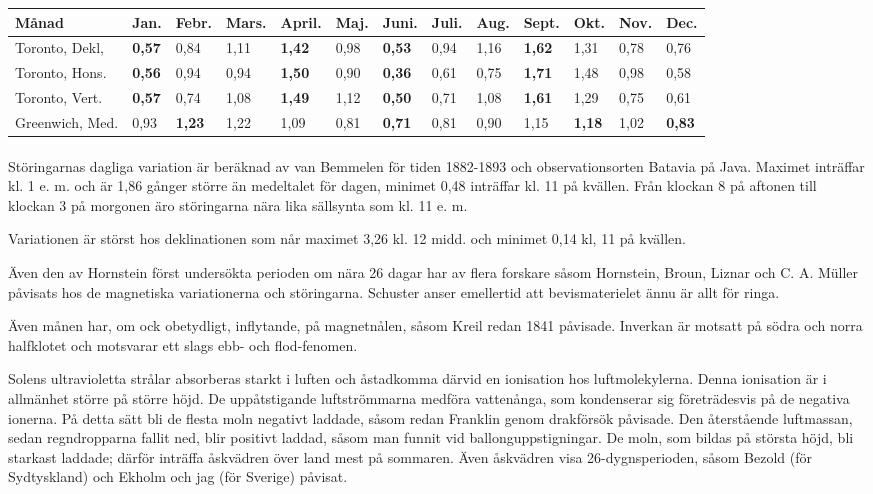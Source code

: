 \documentclass[a4paper, 12pt, oneside, swedish]{article}
\begin{document}
\begin{table}[H]
    \centering
    \footnotesize
    \Fontauri
    \begin{tabular}{l p{4mm} p{4mm} p{4mm} p{4mm} p{4mm} p{4mm} p{4mm} p{4mm} p{4mm} p{4mm} p{4mm} p{4mm}}
        Månad & Jan. & Febr. & Mars. & April. & Maj. & Juni. & Juli. & Aug. & Sept. & Okt. & Nov. & Dec. \\ \hline
        Toronto, Dekl, & \textbf{0,57} & 0,84 & 1,11 & \textbf{1,42} & 0,98 & \textbf{0,53} & 0,94 & 1,16 & \textbf{1,62} & 1,31 & 0,78 & 0,76 \\
        Toronto, Hons. & \textbf{0,56} & 0,94 & 0,94 & \textbf{1,50} & 0,90 & \textbf{0,36} & 0,61 & 0,75 & \textbf{1,71} & 1,48 & 0,98 & 0,58 \\
        Toronto, Vert. & \textbf{0,57} & 0,74 & 1,08 & \textbf{1,49} & 1,12 & \textbf{0,50} & 0,71 & 1,08 & \textbf{1,61} & 1,29 & 0,75 & 0,61 \\
        Greenwich, Med. & 0,93 & \textbf{1,23} & 1,22 & 1,09 & 0,81 & \textbf{0,71} & 0,81 & 0,90 & 1,15 & \textbf{1,18} & 1,02 & \textbf{0,83} \\
    \end{tabular}
\end{table}
\paragraph{}
Störingarnas dagliga variation är beräknad av van Bemmelen för tiden 1882-1893 och observationsorten Batavia på Java. Maximet inträffar kl. 1 e. m. och är 1,86 gånger större än medeltalet för dagen, minimet 0,48 inträffar kl. 11 på kvällen. Från klockan 8 på aftonen till klockan 3 på morgonen äro störingarna nära lika sällsynta som kl. 11 e. m.

Variationen är störst hos deklinationen som når maximet 3,26 kl. 12 midd. och minimet 0,14 kl, 11 på kvällen.

Även den av Hornstein först undersökta perioden om nära 26 dagar har av flera forskare såsom Hornstein, Broun, Liznar och C. A. Müller påvisats hos de magnetiska variationerna och störingarna. Schuster anser emellertid att bevismaterielet ännu är allt för ringa.

Även månen har, om ock obetydligt, inflytande, på magnetnålen, såsom Kreil redan 1841 påvisade. Inverkan är motsatt på södra och norra halfklotet och motsvarar ett slags ebb- och flod-fenomen.

Solens ultravioletta strålar absorberas starkt i luften och åstadkomma därvid en ionisation hos luftmolekylerna. Denna ionisation är i allmänhet större på större höjd. De uppåtstigande luftströmmarna medföra vattenånga, som kondenserar sig företrädesvis på de negativa ionerna. På detta sätt bli de flesta moln negativt laddade, såsom redan Franklin genom drakförsök påvisade. Den återstående luftmassan, sedan regndropparna fallit ned, blir positivt laddad, såsom man funnit vid ballonguppstigningar. De moln, som bildas på största höjd, bli starkast laddade; därför inträffa åskvädren över land mest på sommaren. Även åskvädren visa 26-dygnsperioden, såsom Bezold (för Sydtyskland) och Ekholm och jag (för Sverige) påvisat.
\end{document}
